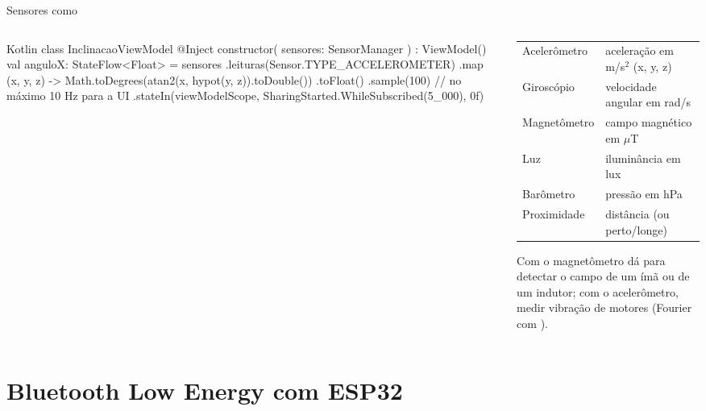 \documentclass[aspectratio=169,10pt]{beamer}
\begin{document}
\begin{frame}[fragile]{Sensores como }
  \begin{columns}[T]
    \begin{column}{0.54\textwidth}
\begin{codigo}[title=Usando o callbackFlow do Módulo 06]{Kotlin}
class InclinacaoViewModel @Inject constructor(
  sensores: SensorManager
) : ViewModel() {
  val anguloX: StateFlow<Float> = sensores
    .leituras(Sensor.TYPE_ACCELEROMETER)
    .map { (x, y, z) ->
      Math.toDegrees(atan2(x, hypot(y, z)).toDouble())
        .toFloat()
    }
    .sample(100)       // no máximo 10 Hz para a UI
    .stateIn(viewModelScope,
      SharingStarted.WhileSubscribed(5_000), 0f)
}
\end{codigo}
    \end{column}
    \begin{column}{0.44\textwidth}
      \scriptsize
      \begin{tabularx}{\linewidth}{@{}l L@{}}
        \toprule
         &  \\
        \midrule
        Acelerômetro & aceleração em m/s$^2$ (x, y, z) \\
        Giroscópio & velocidade angular em rad/s \\
        Magnetômetro & campo magnético em $\mu$T \\
        Luz & iluminância em lux \\
        Barômetro & pressão em hPa \\
        Proximidade & distância (ou perto/longe) \\
        \bottomrule
      \end{tabularx}
      \begin{dica}
        Com o magnetômetro dá para detectar o campo de um ímã ou de um indutor; com o acelerômetro, medir vibração de motores (Fourier com ).
      \end{dica}
    \end{column}
  \end{columns}
\end{frame}

\section{Bluetooth Low Energy com ESP32}
\end{document}
